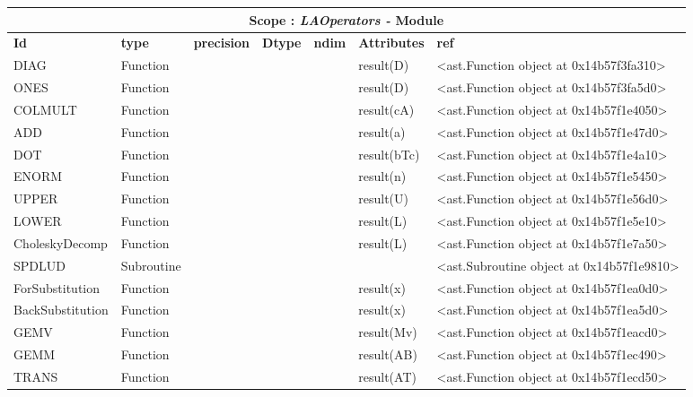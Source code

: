 \documentclass{report}
\begin{document}
\begin{center}
\begin{longtable}{|p{3.5cm}|p{1.5cm}|p{1.5cm}|p{1.5cm}|p{1cm}|p{2cm}|p{4cm}| }
\hline
\multicolumn{7}{|c|}{\textbf{Scope : \qquad}  \textbf{\textit{LAOperators - }Module}}\\ 
\hline
\textbf{Id} & \textbf{type} & \textbf{precision} & \textbf{Dtype} & \textbf{ndim} & \textbf{Attributes} & \textbf{ref} \\\hline

DIAG & Function &  &  &  & result(D) & <ast.Function object at 0x14b57f3fa310> \\\hline

ONES & Function &  &  &  & result(D) & <ast.Function object at 0x14b57f3fa5d0> \\\hline

COLMULT & Function &  &  &  & result(cA) & <ast.Function object at 0x14b57f1e4050> \\\hline

ADD & Function &  &  &  & result(a) & <ast.Function object at 0x14b57f1e47d0> \\\hline

DOT & Function &  &  &  & result(bTc) & <ast.Function object at 0x14b57f1e4a10> \\\hline

ENORM & Function &  &  &  & result(n) & <ast.Function object at 0x14b57f1e5450> \\\hline

UPPER & Function &  &  &  & result(U) & <ast.Function object at 0x14b57f1e56d0> \\\hline

LOWER & Function &  &  &  & result(L) & <ast.Function object at 0x14b57f1e5e10> \\\hline

CholeskyDecomp & Function &  &  &  & result(L) & <ast.Function object at 0x14b57f1e7a50> \\\hline

SPDLUD & Subroutine &  &  &  &  & <ast.Subroutine object at 0x14b57f1e9810> \\\hline

ForSubstitution & Function &  &  &  & result(x) & <ast.Function object at 0x14b57f1ea0d0> \\\hline

BackSubstitution & Function &  &  &  & result(x) & <ast.Function object at 0x14b57f1ea5d0> \\\hline

GEMV & Function &  &  &  & result(Mv) & <ast.Function object at 0x14b57f1eacd0> \\\hline

GEMM & Function &  &  &  & result(AB) & <ast.Function object at 0x14b57f1ec490> \\\hline

TRANS & Function &  &  &  & result(AT) & <ast.Function object at 0x14b57f1ecd50> \\\hline

\end{longtable}
\end{center}
\end{document}
